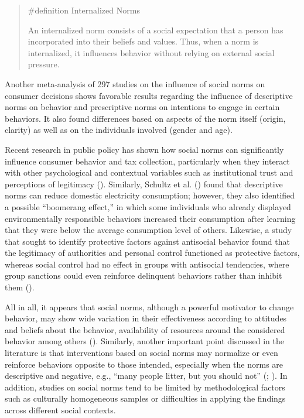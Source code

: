 \documentclass[
  letterpaper,
]{book}
\begin{document}
\begin{quote}
\label{def-internalnorms}{\#definition} Internalized
Norms

An internalized norm consists of a social expectation that a person has
incorporated into their beliefs and values. Thus, when a norm is
internalized, it influences behavior without relying on external social
pressure.
\end{quote}

Another meta-analysis of 297 studies on the influence of social norms on
consumer decisions shows favorable results regarding the influence of
descriptive norms on behavior and prescriptive norms on intentions to
engage in certain behaviors. It also found differences based on aspects
of the norm itself (origin, clarity) as well as on the individuals
involved (gender and age).

Recent research in public policy has shown how social norms can
significantly influence consumer behavior and tax collection,
particularly when they interact with other psychological and contextual
variables such as institutional trust and perceptions of legitimacy
(). Similarly, Schultz et al.
() found that descriptive
norms can reduce domestic electricity consumption; however, they also
identified a possible ``boomerang effect,'' in which some individuals
who already displayed environmentally responsible behaviors increased
their consumption after learning that they were below the average
consumption level of others. Likewise, a study that sought to identify
protective factors against antisocial behavior found that the legitimacy
of authorities and personal control functioned as protective factors,
whereas social control had no effect in groups with antisocial
tendencies, where group sanctions could even reinforce delinquent
behaviors rather than inhibit them
().

All in all, it appears that social norms, although a powerful motivator
to change behavior, may show wide variation in their effectiveness
according to attitudes and beliefs about the behavior, availability of
resources around the considered behavior among others
().
Similarly, another important point discussed in the literature is that
interventions based on social norms may normalize or even reinforce
behaviors opposite to those intended, especially when the norms are
descriptive and negative, e.g., ``many people litter, but you should
not'' (;
). In
addition, studies on social norms tend to be limited by methodological
factors such as culturally homogeneous samples or difficulties in
applying the findings across different social contexts.
\end{document}
